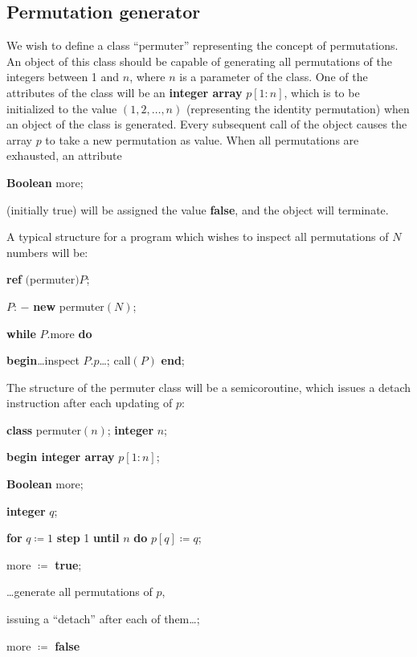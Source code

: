 \subsection{Permutation generator}

We wish to define a class ``permuter'' representing the concept of permutations. An object of this class should be capable of generating all permutations of the integers between 1 and $n$, where $n$ is a parameter of the class. One of the attributes of the class will be an \textbf{integer array} $p[1:n]$, which is to be initialized to the value $(1, 2, \dots, n)$ (representing the identity permutation) when an object of the class is generated. Every subsequent call of the object
causes the array $p$ to take a new permutation as value. When all permutations are exhausted, an attribute 

\quad \textbf{Boolean} more;

\noindent
(initially true) will be assigned the value \textbf{false}, and the object will terminate.

A typical structure for a program which wishes to inspect all permutations of $N$ numbers will be:

\quad \textbf{ref} $($permuter$)P$;

\quad $P$: $-$ \textbf{new} permuter$(N)$;

\quad \textbf{while} $P$.more \textbf{do}

\quad \quad \textbf{begin}\dots inspect $P.p$\dots; call$(P)$ \textbf{end};

\noindent
The structure of the permuter class will be a semicoroutine, which issues a detach instruction after each updating of $p$:

\quad \textbf{class} permuter$(n)$; \textbf{integer} $n$;

\quad \quad \textbf{begin integer array} $p[1:n]$;

\quad \quad \quad \textbf{Boolean} more;

\quad \quad \quad \textbf{integer} $q$;

\quad \quad \quad \textbf{for} $q\coloneq 1$ \textbf{step} 1 \textbf{until} $n$ \textbf{do} $p[q]\coloneq q$;

\quad \quad \quad more $\coloneq$ \textbf{true};

\tabto*{3.3em} \dots generate all permutations of $p$,

\quad \quad \quad issuing a ``detach'' after each of them\dots;

\quad \quad \quad more $\coloneq$ \textbf{false}

